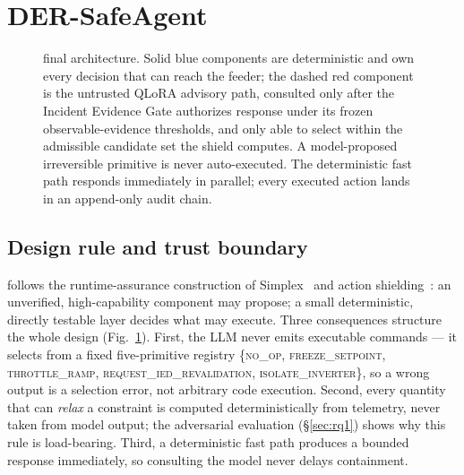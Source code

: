 \section{DER-SafeAgent}
\label{sec:architecture}

\begin{figure}[t]
  \centering
  
  \caption{\ours{} final architecture. Solid blue components are
    deterministic and own every decision that can reach the feeder; the
    dashed red component is the untrusted QLoRA advisory path, consulted
    only after the Incident Evidence Gate authorizes response under its
    frozen observable-evidence thresholds, and only able to select within the
    admissible candidate set the shield
    computes. A model-proposed irreversible primitive is never
    auto-executed. The deterministic fast path responds immediately in
    parallel; every executed action lands in an append-only audit chain.}
  \label{fig:architecture}
\end{figure}

\subsection{Design rule and trust boundary}
\label{sec:method-layering}
\ours{} follows the runtime-assurance construction of
Simplex~\cite{Sha2001Simplex} and action
shielding~\cite{Alshiekh2018Shielding}: an unverified, high-capability
component may propose; a small deterministic, directly testable layer decides
what may execute. Three consequences structure the whole design
(Fig.~\ref{fig:architecture}). First, the LLM never emits executable
commands --- it selects from a fixed five-primitive registry
\{\textsc{no\_op}, \textsc{freeze\_\allowbreak setpoint},
\textsc{throttle\_\allowbreak ramp},
\textsc{request\_\allowbreak ied\_\allowbreak revalidation},
\textsc{isolate\_\allowbreak inverter}\}, so a
wrong output is a selection error, not arbitrary code execution. Second,
every quantity that can \emph{relax} a constraint is computed
deterministically from telemetry, never taken from model output; the
adversarial evaluation (\S\ref{sec:rq1}) shows why this rule is
load-bearing. Third, a deterministic fast path produces a bounded
response immediately, so consulting the model never delays containment.

